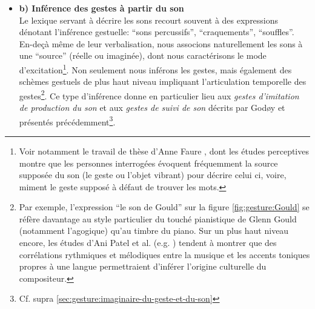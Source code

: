 \begin{itemize}[noitemsep]
	\indent Une cohérence entre plusieurs éléments qui vont à l'encontre de nos pré-supposés peut aussi nous amener à ré-évaluer notre propre perception et, par suite, nos attentes. C'est ce qui se passe en particulier lorsque qu'un élément musical qui nous paraissait \textit{a priori} bancal, inharmonieux, étrange, \textit{imprévu} parce qu'\textit{anormal} est légitimée par sa répétition. Les accords dissonants de Stravinsky, qui étaient inhabituels au début du ~siècle, sont depuis rentrés dans le langage courant, si l'on peut dire, par la quantité de musiques (en particulier de film) qui ont repris ces motifs. Dans un autre registre, le groove bancal du \textit{Dilla Feel}\footnote{Le \textit{Drunk feel} ou \textit{Dilla Feel}, en référence au style du producteur de hip-hop J Dilla, consiste en un léger décalage de certains temps et donne au rythme un style nonchalant, comme s'il était joué par une personne ivre. L'album ``Fan-Tas-Tic Vol. 1'' du groupe de rap \textit{Slum Village} est un des premiers à introduire ce style en 1997.}, original dans le paysage de la fin des années 1990, est aujourd'hui omniprésent dans la musique hip-hop.

	\item \textbf{b) Inférence des gestes à partir du son}\\
	Le lexique servant à décrire les sons recourt souvent à des expressions dénotant l'inférence gestuelle: ``sons percussifs'', ``craquements'', ``souffles''. En-deçà même de leur verbalisation, nous associons naturellement les sons à une ``source'' (réelle ou imaginée), dont nous caractérisons le mode d'excitation\footnote{Voir notamment le travail de thèse d'Anne Faure \cite{faure_sons_2000}, dont les études perceptives montre que les personnes interrogées évoquent fréquemment la source supposée du son (le geste ou l'objet vibrant) pour décrire celui ci, voire, miment le geste supposé à défaut de trouver les mots.}. Non seulement nous inférons les gestes, mais également des schèmes gestuels de plus haut niveau impliquant l'articulation temporelle des gestes\footnote{Par exemple, l'expression ``le son de Gould'' sur la figure \ref{fig:gesture:Gould} se réfère davantage au style particulier du touché pianistique de Glenn Gould (notamment l'agogique) qu'au timbre du piano. Sur un plus haut niveau encore, les études d'Ani Patel et al. (e.g. \cite{patel_comparing_2006}) tendent à montrer que des corrélations rythmiques et mélodiques entre la musique et les accents toniques propres à une langue permettraient d'inférer l'origine culturelle du compositeur.}. Ce type d'inférence donne en particulier lieu aux \textit{gestes d'imitation de production du son} et aux \textit{gestes de suivi de son} décrits par Godøy et présentés précédemment\footnote{Cf. supra \ref{sec:gesture:imaginaire-du-geste-et-du-son}}.


\end{itemize}
